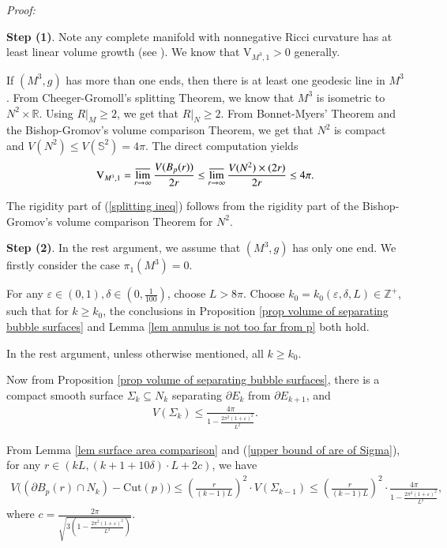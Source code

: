 \documentclass[11pt]{amsart}
\numberwithin{equation}{section}
\def\pf{{\it Proof:}~}
\begin{document}
\pf
{\textbf{Step (1)}. Note any complete manifold with nonnegative Ricci curvature has at least linear volume growth (see \cite{Yau-linear}). We know that $\displaystyle \mathrm{V}_{M^3, 1}> 0$ generally. 

If $(M^3, g)$ has more than one ends, then there is at least one geodesic line in $M^3$.
From Cheeger-Gromoll's splitting Theorem, we know that $M^3$ is isometric to $N^2\times \mathbb{R}$. Using $R\big|_M\geq 2$, we get that $R\big|_N\geq 2$. From Bonnet-Myers' Theorem and the Bishop-Gromov's volume comparison Theorem, we get that $N^2$ is compact and $V(N^2)\leq V(\mathbb{S}^2)= 4\pi$. The direct computation yields 
\begin{align}
\mathrm{V}_{M^3, 1}= \varlimsup\limits_{r\rightarrow\infty}\frac{V(B_p(r))}{2r}\leq \varlimsup\limits_{r\rightarrow\infty}\frac{V(N^2)\times (2r)}{2r}\leq 4\pi. \label{splitting ineq}
\end{align}

The rigidity part of (\ref{splitting ineq}) follows from the rigidity part of the Bishop-Gromov's volume comparison Theorem for $N^2$. 

\textbf{Step (2)}. In the rest argument, we assume that $(M^3, g)$ has only one end. We firstly consider the case $\pi_1(M^3)= 0$.

For any $\varepsilon\in (0, 1), \delta\in (0,  \frac{1}{100})$,  choose $L>  8\pi$.  Choose $k_0= k_0(\varepsilon, \delta,  L)\in \mathbb{Z}^+$,  such that for $k\geq k_0$,  the conclusions in Proposition \ref{prop volume of separating bubble surfaces} and Lemma \ref{lem annulus is not too far from p} both hold.   

In the rest argument, unless otherwise mentioned, all $k\geq k_0$.

Now from Proposition \ref{prop volume of separating bubble surfaces}, there is a compact smooth surface $\Sigma_k\subseteq N_k$ separating $\partial E_k$ from $\partial E_{k+ 1}$, and
\begin{align}
V(\Sigma_{k})\leq \frac{4\pi}{1- \frac{2\pi^2(1+\varepsilon)^2}{L^2}}. \label{upper bound of are of Sigma}
\end{align}

From Lemma \ref{lem surface area comparison} and (\ref{upper bound of are of Sigma}),  for any $r\in (kL,  (k+ 1+ 10\delta)\cdot L+ 2c)$,  we have
\begin{align}
V\Big((\partial B_p(r)\cap N_k)- \mathrm{Cut}(p)\Big)\leq \left(\frac{r}{(k- 1)L}\right)^2\cdot V(\Sigma_{k- 1})\leq \left(\frac{r}{(k- 1)L}\right)^2\cdot \frac{4\pi}{1- \frac{2\pi^2(1+\varepsilon)^2}{L^2}},\label{slice upper}
\end{align}
where $\displaystyle c= \frac{2\pi}{\sqrt{3(1- \frac{2\pi^2(1+ \varepsilon)^2}{L^2})}}$.

}
\end{document}
